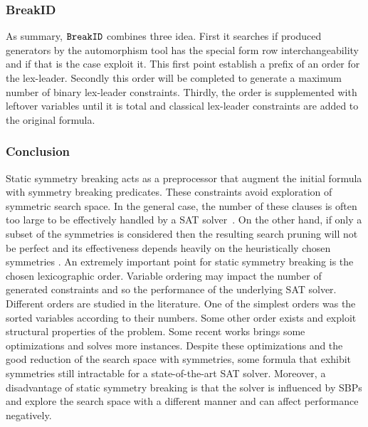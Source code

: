 \subsubsection{BreakID}


As summary, $\texttt{BreakID}$ combines three idea. First it searches if produced generators by the automorphism tool has the special
form row interchangeability and if that is the case exploit it. This first point establish a prefix of an order for the lex-leader.
Secondly this order will be completed to generate a maximum number of binary lex-leader constraints. Thirdly, the order is supplemented with leftover variables until it is total and classical lex-leader constraints are added to the original formula. 



%


\subsubsection{Conclusion}
Static symmetry breaking acts as a preprocessor that augment the initial formula with
symmetry breaking predicates. These constraints avoid exploration of symmetric search space.
In the general case, the number of these clauses is often too large to be
effectively handled by a SAT solver~\cite{Luks2004}. 
On the other hand, if only a subset of the symmetries is considered then the resulting search pruning
will not be perfect and its effectiveness depends heavily on the
heuristically chosen symmetries \cite{biere2009handbook}.
An extremely important point for static symmetry breaking is the chosen lexicographic order.
Variable ordering may impact the number of generated constraints and so the performance of
the underlying SAT solver. Different orders are studied in the literature. 
One of the simplest orders was the sorted variables according to their numbers.
Some other order exists and exploit structural properties of the 
problem. 
Some recent works brings some optimizations and solves more instances.
Despite these optimizations and the good reduction of the search space with symmetries,
some formula that exhibit symmetries still intractable for a state-of-the-art SAT solver.
Moreover, a disadvantage of static symmetry breaking is that the solver is influenced by SBPs
and explore the search space with a different manner and can affect performance negatively.


